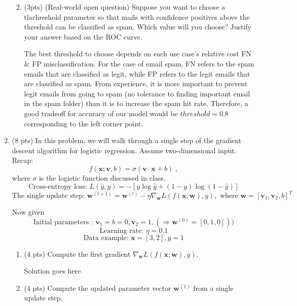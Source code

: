 \documentclass[a4paper]{article}
\theoremstyle{definition}
\renewcommand\vec[1]{\mathbf{#1}}
\newenvironment{soln}{
    \leavevmode\color{blue}\ignorespaces
}{}
\begin{document}
\begin{enumerate}
\begin{enumerate}
\begin{soln}
                \end{soln}

          \item (3pts) (Real-world open question) Suppose you want to choose a tlarhreshold parameter so that mails with confidence positives above the threshold can be classified as spam. Which value will you choose? Justify your answer based on the ROC curve.

                \begin{soln}  The best threshold to choose depends on each use case's relative cost FN \& FP misclassification. For the case of email spam, FN refers to the spam emails that are classified as legit, while FP refers to the legit emails that are classified as spam. From experience, it is more important to prevent legit emails from going to spam (no tolerance to finding important email in the spam folder) than it is to increase the spam hit rate. Therefore, a good tradeoff for accuracy of our model would be $threshold = 0.8$ corresponding to the left corner point. \end{soln}
        \end{enumerate}

  \item (8 pts) In this problem, we will walk through a single step of the gradient descent algorithm for logistic regression. Assume two-dimensional input.
        Recap:
        $$f(\vec x;\vec v, b) = \sigma(\vec v \cdot \vec x + b) \;,$$
        where $\sigma$ is the logistic function discussed in class.
        $$\text{Cross-entropy loss: } L(\hat{y}, y) = -[y \log  \hat{y} + (1-y)\log(1-\hat{y})]$$
        $$\text{The single update step: } \vec w^{(t+1)} = \vec w^{(t)} - \eta \nabla_{\vec w} L(f(\vec x;\vec w), y),\text{ where } \vec w=[\vec v_{1}, \vec v_{2}, b]^T $$

        Now given
        $$ \text{Initial parameters : } \vec v_{1}=b=0,\vec v_{2}=1,(\Rightarrow \vec w^{(0)}=[0, 1, 0]))$$
        $$ \text{Learning rate: }\eta=0.1$$
        $$ \text{Data example: } \vec x=[3, 2], y=1$$

        \begin{enumerate}
          \item (4 pts) Compute the first gradient $\nabla_{\vec w} L(f(\vec x;\vec w), y)$.

                \begin{soln}  Solution goes here. \end{soln}

          \item (4 pts) Compute the updated parameter vector $\vec w^{(1)}$ from a single update step.


\end{enumerate}
\end{enumerate}
\end{document}

